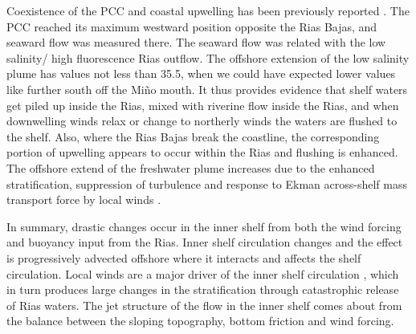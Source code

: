 Coexistence of the PCC and coastal upwelling has been previously
reported \citep{Castro97,Peliz02}. The PCC reached its maximum
westward position opposite the Rias Bajas, and seaward flow was
measured there. The seaward flow was related with the low
salinity/ high fluorescence Rias outflow. The offshore extension
of the low salinity plume has values not less than 35.5, when we
could have expected lower values like further south off the
Mi\~{n}o mouth. It thus provides evidence that shelf waters get
piled up inside the Rias, mixed with riverine flow inside the
Rias, and when downwelling winds relax or change to northerly
winds the waters are flushed to the shelf. Also, where the Rias
Bajas break the coastline, the corresponding portion of upwelling
appears to occur within the Rias \citep{Alvarez-Salgado00} and
flushing is enhanced. The offshore extend of the freshwater plume
increases due to the enhanced stratification, suppression of
turbulence and response to Ekman across-shelf mass transport force
by local winds \citep{weisberg01}.

In summary, drastic changes occur in the inner shelf from both the
wind forcing and buoyancy input from the Rias. Inner shelf
circulation changes and the effect is progressively advected
offshore where it interacts and affects the shelf circulation.
Local winds are a major driver of the inner shelf circulation
\citep{weisberg01}, which in turn produces large changes in the
stratification through catastrophic release of Rias waters. The
jet structure of the flow in the inner shelf comes about from the
balance between the sloping topography, bottom friction and wind
forcing.




